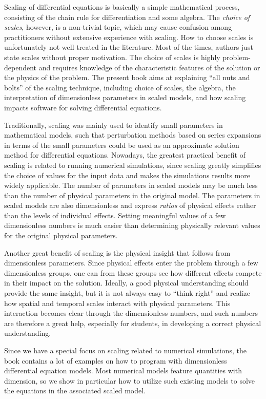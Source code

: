 \documentclass[graybox,envcountchap,sectrefs,final]{svmonodo}
\begin{document}
Scaling of differential equations is basically a simple mathematical
process, consisting of the chain rule for differentiation and some
algebra.  The \emph{choice of scales}, however, is a non-trivial topic,
which may cause confusion among practitioners without extensive
experience with scaling.  How to choose scales is unfortunately not
well treated in the literature. Most of the times, authors just state
scales without proper motivation. The choice of scales is highly
problem-dependent and requires knowledge of the characteristic
features of the solution or the physics of the problem.  The present
book aims at explaining ``all nuts and bolts'' of the scaling
technique, including choice of scales, the algebra, the interpretation
of dimensionless parameters in scaled models, and how scaling impacts
software for solving differential equations.

Traditionally, scaling was mainly used to identify small parameters in
mathematical models, such that perturbation methods based on series
expansions in terms of the small parameters could be used as an
approximate solution method for differential equations.  Nowadays, the
greatest practical benefit of scaling is related to running numerical
simulations, since scaling greatly simplifies the choice of values for
the input data and makes the simulations results more widely
applicable.  The number of parameters in scaled models may be much
less than the number of physical parameters in the original model. The
parameters in scaled models are also dimensionless and express
\emph{ratios} of physical effects rather than the levels of individual
effects.  Setting meaningful values of a few dimensionless numbers is
much easier than determining physically relevant values for the
original physical parameters.

Another great benefit of scaling is the physical insight that follows
from dimensionless parameters. Since physical effects enter the
problem through a few dimensionless groups, one can from these groups
see how different effects compete in their impact on the
solution. Ideally, a good physical understanding should provide the
same insight, but it is not always easy to ``think right'' and realize
how spatial and temporal scales interact with physical parameters.
This interaction becomes clear through the dimensionless numbers, and
such numbers are therefore a great help, especially for students, in
developing a correct physical understanding.

Since we have a special focus on scaling related to numerical
simulations, the book contains a lot of examples on how to program
with dimensionless differential equation models. Most numerical models
feature quantities with dimension, so we show in particular how to
utilize such existing models to solve the equations in the associated
scaled model.
\end{document}
